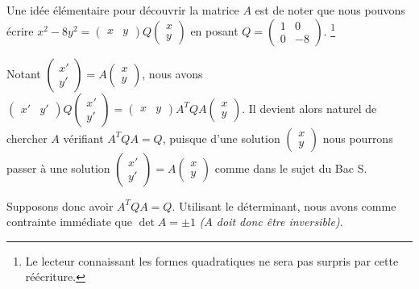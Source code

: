 Une idée élémentaire pour découvrir la matrice  $A$ est de noter que nous pouvons écrire
$x^2 - 8 y^2
=
\begin{pmatrix}
  x & y
\end{pmatrix}
Q
\begin{pmatrix}
  x \\
  y
\end{pmatrix}$
en posant
$Q
=
\begin{pmatrix}
  1 & 0  \\
  0 & -8
\end{pmatrix}$.%
\footnote{
	Le lecteur connaissant les formes quadratiques ne sera pas surpris par cette réécriture.
}


\medskip

Notant
$\begin{pmatrix}
  x' \\
  y'
\end{pmatrix}
=
A
\begin{pmatrix}
  x \\
  y
\end{pmatrix}$,
nous avons
$\begin{pmatrix}
  x' & y'
\end{pmatrix}
Q
\begin{pmatrix}
  x' \\
  y'
\end{pmatrix}
=
\begin{pmatrix}
  x & y
\end{pmatrix}
A^T Q A
\begin{pmatrix}
  x \\
  y
\end{pmatrix}$.
Il devient alors naturel de chercher $A$ vérifiant $A^T Q A = Q$,
puisque d'une solution
$\begin{pmatrix}
  x \\
  y
\end{pmatrix}$
nous pourrons passer à une  solution
$\begin{pmatrix}
  x' \\
  y'
\end{pmatrix}
=
A \begin{pmatrix}
  x \\
  y
\end{pmatrix}$
comme dans le sujet du Bac S.


\medskip

Supposons donc avoir $A^T Q A = Q$.
Utilisant le déterminant, nous avons comme contrainte immédiate que $\det A = \pm 1$ \textit{($A$ doit donc être inversible)}.


